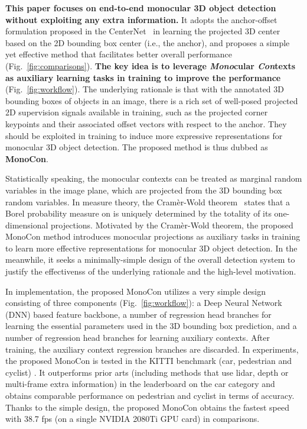 \documentclass[letterpaper]{article} \usepackage{aaai22}  \usepackage{times}  \usepackage{helvet}  \usepackage{courier}  \usepackage[hyphens]{url}  \usepackage{graphicx} \urlstyle{rm} \def\UrlFont{\rm}  \usepackage{natbib}  \usepackage{caption} \DeclareCaptionStyle{ruled}{labelfont=normalfont,labelsep=colon,strut=off} \frenchspacing  \setlength{\pdfpagewidth}{8.5in}  \setlength{\pdfpageheight}{11in}  \usepackage{algorithm}
\begin{document}
  \textbf{This paper focuses on end-to-end monocular 3D object detection without exploiting any extra information.} 
It adopts the anchor-offset formulation proposed in the CenterNet~\cite{centernet} in learning the projected 3D center based on the 2D bounding box center (i.e., the anchor), and proposes a simple yet effective method that facilitates better overall performance (Fig.~\ref{fig:comparisons}). \textbf{The key idea is to leverage \textit{Mono}cular \textit{Con}texts as auxiliary learning tasks in training to improve the performance} (Fig.~\ref{fig:workflow}). The underlying rationale is that with the annotated 3D bounding boxes of objects in an image, there is a rich set of well-posed projected 2D supervision signals available in training, such as the projected corner keypoints and their associated offset vectors with respect to the anchor. They should be exploited in training to induce more expressive representations for monocular 3D object detection. The proposed method is thus dubbed as \textbf{MonoCon}. 

Statistically speaking, the monocular contexts can be treated as marginal random variables in the image plane, which are projected from the 3D bounding box random variables. In measure theory, the Cram\`er-Wold theorem~\cite{cramer1936some} states that a Borel probability measure on  is uniquely determined by the totality of its one-dimensional projections. Motivated by the Cram\`er-Wold theorem, the proposed MonoCon method introduces monocular projections as auxiliary tasks in training to learn more effective representations for monocular 3D object detection. In the meanwhile, it seeks a minimally-simple design of the overall detection system to justify the effectivenss of the underlying rationale and the high-level motivation.  


In implementation, the proposed MonoCon utilizes a very simple design consisting of three components (Fig.~\ref{fig:workflow}): a Deep Neural Network (DNN) based feature backbone, a number of regression head branches for learning the essential parameters used in the 3D bounding box prediction, and a number of regression head branches for learning auxiliary contexts. After training, the auxiliary context regression branches are discarded. In experiments, the proposed MonoCon is tested in the KITTI benchmark (car, pedestrian and cyclist) \cite{kitti}. It outperforms prior arts (including methods that use lidar, depth or multi-frame extra information) in the leaderboard on the car category and obtains comparable performance on pedestrian and cyclist in terms of accuracy. Thanks to the simple design, the proposed MonoCon  obtains the fastest speed with 38.7 fps (on a single NVIDIA 2080Ti GPU card) in comparisons.  
\end{document}
